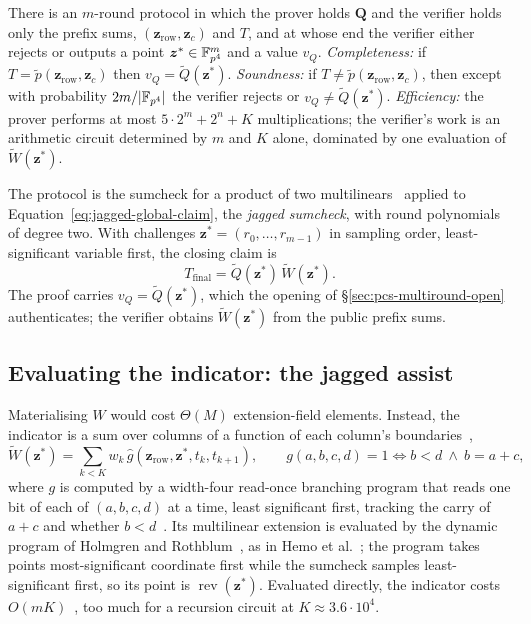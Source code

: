 \begin{theorem}
\label{thm:jagged}
There is an $m$-round protocol in which the prover holds $\mathbf Q$ and the verifier holds only the prefix sums, $(\bm z_{\mathrm{row}}, \bm z_c)$ and $T$, and at whose end the verifier either rejects or outputs a point $\bm z^{*} \in \mathbb{F}_{p^4}^m$ and a value $v_Q$.
\emph{Completeness:} if $T = \widetilde p(\bm z_{\mathrm{row}}, \bm z_c)$ then $v_Q = \widetilde Q(\bm z^{*})$.
\emph{Soundness:} if $T \neq \widetilde p(\bm z_{\mathrm{row}}, \bm z_c)$, then except with probability $2m/|\mathbb{F}_{p^4}|$ the verifier rejects or $v_Q \neq \widetilde Q(\bm z^{*})$.
\emph{Efficiency:} the prover performs at most $5 \cdot 2^m + 2^n + K$ multiplications; the verifier's work is an arithmetic circuit determined by $m$ and $K$ alone, dominated by one evaluation of $\widetilde W(\bm z^{*})$.
\end{theorem}

The protocol is the sumcheck for a product of two multilinears~\citep[Lemma~2.3]{jagged-pcs} applied to Equation~\eqref{eq:jagged-global-claim}, the \emph{jagged sumcheck}, with round polynomials of degree two. With challenges $\bm z^*=(r_0,\ldots,r_{m-1})$ in sampling order, least-significant variable first, the closing claim is
\begin{equation}
\label{eq:jagged-closing}
  T_{\mathrm{final}}=\widetilde Q(\bm z^*)\,\widetilde W(\bm z^*).
\end{equation}
The proof carries $v_Q=\widetilde Q(\bm z^*)$, which the opening of \S\ref{sec:pcs-multiround-open} authenticates; the verifier obtains $\widetilde W(\bm z^*)$ from the public prefix sums.

\subsection{Evaluating the indicator: the jagged assist}
\label{sec:pcs-jagged-assist}

Materialising $W$ would cost $\Theta(M)$ extension-field elements. Instead, the indicator is a sum over columns of a function of each column's boundaries~\citep[Claim~3.2.1, Eq.~(5)]{jagged-pcs},
\[
  \widetilde W(\bm z^{*}) = \sum_{k<K} w_k\, \widehat g(\bm z_{\mathrm{row}}, \bm z^{*}, t_k, t_{k+1}),
  \qquad g(a, b, c, d) = 1 \iff b < d \ \wedge\ b = a + c,
\]
where $g$ is computed by a width-four read-once branching program that reads one bit of each of $(a, b, c, d)$ at a time, least significant first, tracking the carry of $a + c$ and whether $b < d$~\citep[Claim~3.2.2]{jagged-pcs}. Its multilinear extension is evaluated by the dynamic program of Holmgren and Rothblum~\citep{hr18}, as in Hemo et al.~\citep[Lemma~4.2]{jagged-pcs}; the program takes points most-significant coordinate first while the sumcheck samples least-significant first, so its point is $\operatorname{rev}(\bm z^*)$. Evaluated directly, the indicator costs $O(m K)$~\citep[Prop.~3.2]{jagged-pcs}, too much for a recursion circuit at $K \approx 3.6 \cdot 10^4$.

